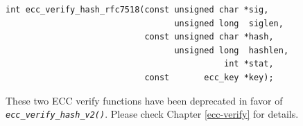 \documentclass[synpaper]{book}
\newcommand{\code}[1]{\texttt{\textit{#1}}}
\begin{document}
\begin{verbatim}
int ecc_verify_hash_rfc7518(const unsigned char *sig,
                                  unsigned long  siglen,
                            const unsigned char *hash,
                                  unsigned long  hashlen,
                                            int *stat,
                            const       ecc_key *key);
\end{verbatim}

These two ECC verify functions have been deprecated in favor of \code{ecc\_verify\_hash\_v2()}.
Please check Chapter \ref{ecc-verify} for details.

\clearpage
{}
\printindex
\end{document}
